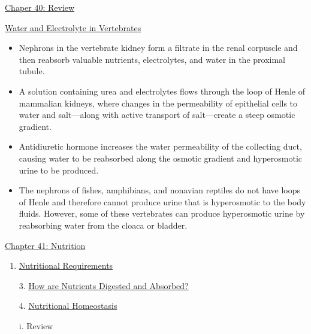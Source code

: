 \documentclass[12pt,letterpaper]{article}
\newcommand{\thetitle}{\hypertarget{home}{Animals and Ecology}}
\begin{document}
\begin{probbox}{\hyperlink{40}{Chaper 40: Review}}
{\begin{itemize}
        \end{itemize}
        \hyperlink{40.5}{Water and Electrolyte in Vertebrates} 
        \begin{itemize}
            \item Nephrons in the vertebrate kidney form a filtrate in the renal corpuscle and then reabsorb valuable nutrients, electrolytes, and water in the proximal tubule. 
            \item A solution containing urea and electrolytes flows through the loop of Henle of mammalian kidneys, where changes in the permeability of epithelial cells to water and salt—along with active transport of salt—create a steep osmotic gradient. 
            \item Antidiuretic hormone increases the water permeability of the collecting duct, causing water to be reabsorbed along the osmotic gradient and hyperosmotic urine to be produced. 
            \item The nephrons of fishes, amphibians, and non­avian reptiles do not have loops of Henle and therefore cannot produce urine that is hyperosmotic to the body fluids. However, some of these vertebrates can produce hyperosmotic urine by reabsorbing water from the cloaca or bladder.
        \end{itemize}    
    }\end{probbox}


\clearpage

\renewcommand{\thetitle}{\hypertarget{41}{Nutrition}}
\hypertarget{41}{}
\setcounter{section}{41}

\begin{chapbox}{\hyperlink{home}{Chapter 41: Nutrition}}
    \begin{enumerate}
        \item \hyperlink{41.1}{Nutritional Requirements}
        \item [3.]\hyperlink{41.3}{How are Nutrients Digested and Absorbed?}
        \item [4.]\hyperlink{41.4}{Nutritional Homeostasis}
        \item [i.]\hypertarget{41.r}{Review}
    \end{enumerate}
\end{chapbox}
\end{document}
